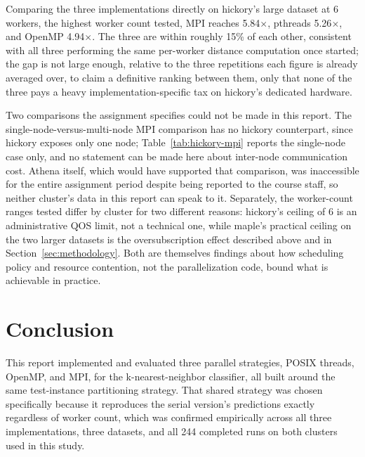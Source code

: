 \documentclass[conference]{IEEEtran}
\begin{document}
Comparing the three implementations directly on hickory's large dataset at
6 workers, the highest worker count tested, MPI reaches 5.84$\times$,
pthreads 5.26$\times$, and OpenMP 4.94$\times$. The three are within
roughly 15\% of each other, consistent with all three performing the same
per-worker distance computation once started; the gap is not large enough,
relative to the three repetitions each figure is already averaged over, to
claim a definitive ranking between them, only that none of the three pays
a heavy implementation-specific tax on hickory's dedicated hardware.

Two comparisons the assignment specifies could not be made in this report.
The single-node-versus-multi-node MPI comparison has no hickory
counterpart, since hickory exposes only one node; Table~\ref{tab:hickory-mpi}
reports the single-node case only, and no statement can be made here about
inter-node communication cost. Athena itself, which would have supported
that comparison, was inaccessible for the entire assignment period despite
being reported to the course staff, so neither cluster's data in this
report can speak to it. Separately, the worker-count ranges tested differ
by cluster for two different reasons: hickory's ceiling of 6 is an
administrative QOS limit, not a technical one, while maple's practical
ceiling on the two larger datasets is the oversubscription effect
described above and in Section~\ref{sec:methodology}. Both are themselves
findings about how scheduling policy and resource contention, not the
parallelization code, bound what is achievable in practice.

\section{Conclusion}
\label{sec:conclusion}

This report implemented and evaluated three parallel strategies, POSIX
threads, OpenMP, and MPI, for the k-nearest-neighbor classifier, all built
around the same test-instance partitioning strategy. That shared strategy
was chosen specifically because it reproduces the serial version's
predictions exactly regardless of worker count, which was confirmed
empirically across all three implementations, three datasets, and all 244
completed runs on both clusters used in this study.
\end{document}
